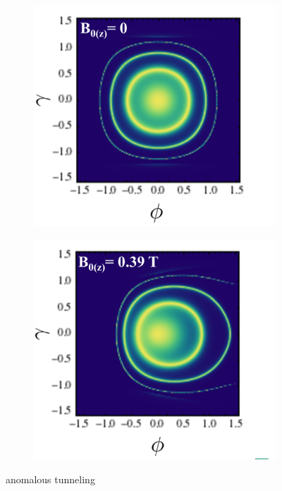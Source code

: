\begin{figure}[H]
        \begin{subfigure}[b]{0.4\linewidth}
            \includegraphics[width = \linewidth]{fig/Chap 2/anomalous5.png}
            \caption{}
            \label{2fig:anomalous5}
        \end{subfigure}
        \begin{subfigure}[b]{0.4\linewidth}
            \includegraphics[width = \linewidth]{fig/Chap 2/anomalous6.png}
            \caption{}
            \label{2fig:anomalous6}
        \end{subfigure}
    \caption{anomalous tunneling}
    \label{2fig:anomalous}
    \end{figure}

